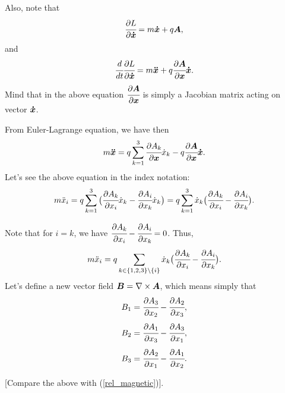 \documentclass[main.tex]{subfiles}
\begin{document}
Also, note that 
\begin{equation}
\cfrac{\partial L}{\partial \boldsymbol{\dot{x}}} = m\boldsymbol{\dot{x}} + q\boldsymbol{A},
\end{equation}
and
\begin{equation}
\cfrac{d}{dt}\cfrac{\partial L}{\partial \boldsymbol{\dot{x}}} = m\boldsymbol{\ddot{x}} + q\cfrac{\partial \boldsymbol{A}}{\partial \boldsymbol{x}} \boldsymbol{\dot{x}}.
\end{equation}
Mind that in the above equation $\cfrac{\partial \boldsymbol{A}}{\partial \boldsymbol{x}}$ is simply a Jacobian matrix acting on vector $\boldsymbol{\dot{x}}$.

From Euler-Lagrange equation, we have then
\begin{equation}
\label{magnetic-prep}
m\boldsymbol{\ddot{x}} = q\sum_{k=1}^3 \cfrac{\partial A_k}{\partial \boldsymbol{x}} \dot{x}_k - q\cfrac{\partial \boldsymbol{A}}{\partial \boldsymbol{x}} \boldsymbol{\dot{x}}.
\end{equation}
Let's see the above equation in the index notation:
\begin{equation}
m \ddot{x}_i = q\sum_{k=1}^3 \big(\cfrac{\partial A_k}{\partial x_i} \dot{x}_k - \cfrac{\partial A_i}{\partial x_k} \dot{x}_k\big) = q\sum_{k=1}^3 \dot{x}_k 
\big(\cfrac{\partial A_k}{\partial x_i} - \cfrac{\partial A_i}{\partial x_k}\big).
\end{equation}

Note that for $i=k$, we have $\cfrac{\partial A_k}{\partial x_i} - \cfrac{\partial A_i}{\partial x_k} = 0$. Thus, 
\begin{equation}
m \ddot{x}_i = q\sum_{k\in\{1,2,3\}\setminus\{i\}} \dot{x}_k 
\big(\cfrac{\partial A_k}{\partial x_i} - \cfrac{\partial A_i}{\partial x_k}\big).
\end{equation}
Let's define a new vector field $\boldsymbol{B} = \nabla \times \boldsymbol{A}$, which means simply that
\begin{equation}
B_1 = \cfrac{\partial A_3}{\partial x_2} - \cfrac{\partial A_2}{\partial x_3}, 
\end{equation}
\begin{equation}
B_2 = \cfrac{\partial A_1}{\partial x_3} - \cfrac{\partial A_3}{\partial x_1}, 
\end{equation}
\begin{equation}
B_3 = \cfrac{\partial A_2}{\partial x_1} - \cfrac{\partial A_1}{\partial x_2}. 
\end{equation}

[Compare the above with (\ref{rel_magnetic})]. 
\end{document}
